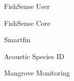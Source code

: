 \item FishSense User
\item FishSense Core
\item Smartfin
\item Acoustic Species ID
\item Mangrove Monitoring

